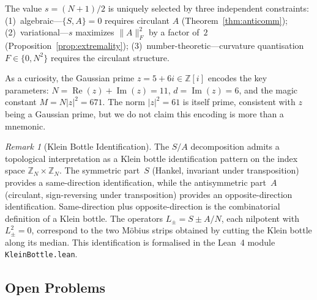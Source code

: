 \documentclass[aip,jmp,reprint,superscriptaddress,floatfix,nofootinbib]{revtex4-2}
\theoremstyle{definition}
\theoremstyle{remark}
\newtheorem{remark}[theorem]{Remark}
\begin{document}
The value $s = (N+1)/2$ is uniquely selected by three independent
constraints: (1)~algebraic---$\{S,A\}=0$ requires circulant $A$
(Theorem~\ref{thm:anticomm}); (2)~variational---$s$ maximizes
$\|A\|_F^2$ by a factor of~$2$
(Proposition~\ref{prop:extremality}); (3)~number-theoretic---curvature
quantisation $F \in \{0, N^2\}$ requires the circulant structure.

As a curiosity, the Gaussian prime
$z = 5 + 6i \in \mathbb{Z}[i]$ encodes the key parameters:
$N = \operatorname{Re}(z) + \operatorname{Im}(z) = 11$,
$d = \operatorname{Im}(z) = 6$, and the magic constant
$M = N|z|^2 = 671$.  The norm $|z|^2 = 61$ is itself prime,
consistent with $z$ being a Gaussian prime, but we do not claim
this encoding is more than a mnemonic.

\begin{remark}[Klein Bottle Identification]
\label{rmk:klein}
The $S/A$ decomposition admits a topological interpretation as a Klein bottle
identification pattern on the index space $\mathbb{Z}_N \times \mathbb{Z}_N$.
The symmetric part~$S$ (Hankel, invariant under transposition) provides a
same-direction identification, while the antisymmetric part~$A$ (circulant,
sign-reversing under transposition) provides an opposite-direction identification.
Same-direction plus opposite-direction is the combinatorial definition of a
Klein bottle. The operators $L_\pm = S \pm A/N$, each nilpotent with
$L_\pm^2 = 0$, correspond to the two M\"obius strips obtained by cutting
the Klein bottle along its median. This identification is formalised in the
Lean~4 module \texttt{KleinBottle.lean}.
\end{remark}

\subsection{Open Problems}
\label{sec:disc:open}
\end{document}
